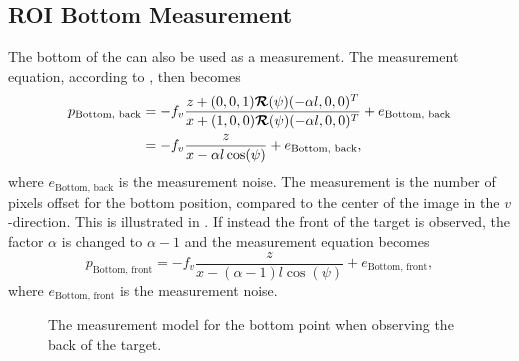 \newpage

\subsection{ROI Bottom Measurement}

The bottom of the \abbrROI can also be used as a measurement.
The measurement equation, according to , then becomes
%
\begin{equation}
\begin{split}
    p_{\text{Bottom, back}} &= -f_v \frac{z + (0,0,1) \bm{\mathcal{R}}(\psi) (- \alpha l,0,0)^T}{x + (1,0,0) \bm{\mathcal{R}}(\psi) (- \alpha l,0,0)^T} + e_{\text{Bottom, back}} \\
    &= -f_v \frac{z}{x - \alpha l \cos(\psi)} + e_{\text{Bottom, back}},
\end{split}
\end{equation}
%
where $e_{\text{Bottom, back}}$ is the measurement noise.
The measurement is the number of pixels offset for the bottom position, compared to the center of the image in the $v$-direction.
This is illustrated in .
If instead the front of the target is observed, the factor $\alpha$ is changed to $\alpha-1$ and the measurement equation becomes
%
\begin{equation}
    p_{\text{Bottom, front}} =  -f_v \frac{z}{x - (\alpha - 1) l \cos(\psi)} + e_{\text{Bottom, front}},
\end{equation}
where $e_{\text{Bottom, front}}$ is the measurement noise.

\begin{figure}[!ht]
    \centering
    \caption{\label{fig:measurementmodelbottom} The measurement model for the \abbrROI bottom point when observing the back of the target.}
\end{figure}

